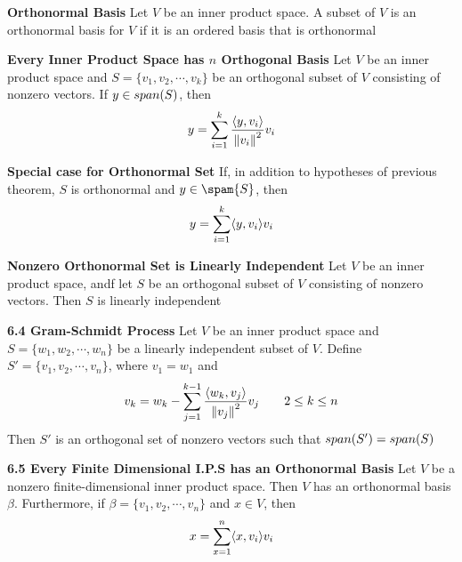 \documentclass[11pt]{article}
\begin{document}
 

\begin{defn*}
    \textbf{Orthonormal Basis} Let $V$ be an inner product space. A subset of $V$ is an orthonormal basis for $V$ if it is an ordered basis that is orthonormal
\end{defn*}

\begin{defn*}
    \textbf{Every Inner Product Space has $n$ Orthogonal Basis} Let $V$ be an inner product space and $S = \{ v_1, v_2, \cdots, v_k\}$ be an orthogonal subset of $V$ consisting of nonzero vectors. If $y\in span(S)$, then 
    \[
        y = \sum_{i=1}^k \frac{\langle y,v_i\rangle}{\left\lVert v_i\right\rVert^2} v_i
    \]
\end{defn*}

\begin{corollary*}
    \textbf{Special case for Orthonormal Set} If, in addition to hypotheses of previous theorem, $S$ is orthonormal and $y\in \spam{S}$, then 
    \[
        y = \sum_{i=1}^k \langle y,v_i\rangle v_i    
    \]
\end{corollary*}

\begin{corollary*}
    \textbf{Nonzero Orthonormal Set is Linearly Independent} Let $V$ be an inner product space, andf let $S$ be an orthogonal subset of $V$ consisting of nonzero vectors. Then $S$ is linearly independent
\end{corollary*}

\begin{theorem*}
    \textbf{6.4 Gram-Schmidt Process} Let $V$ be an inner product space and $S = \{w_1,w_2,\cdots, w_n\}$ be a linearly independent subset of $V$. Define $S' = \{v_1,v_2,\cdots, v_n\}$, where $v_1 = w_1$ and 
    \[
        v_k = w_k - \sum_{j=1}^{k-1} \frac{\langle w_k,v_j\rangle}{\left\lVert v_j\right\rVert^2} v_j 
        \quad \quad 
        2\leq k\leq n
    \]
    Then $S'$ is an orthogonal set of nonzero vectors such that $span(S') = span(S)$
\end{theorem*}



\begin{theorem*}
    \textbf{6.5 Every Finite Dimensional I.P.S has an Orthonormal Basis} Let $V$ be a nonzero finite-dimensional inner product space. Then $V$ has an orthonormal basis $\beta$. Furthermore, if $\beta = \{v_1, v_2,\cdots, v_n\}$ and $x\in V$, then 
    \[
        x = \sum_{x=1}^n \langle x,v_i\rangle v_i    
    \]
\end{theorem*}
\end{document}
